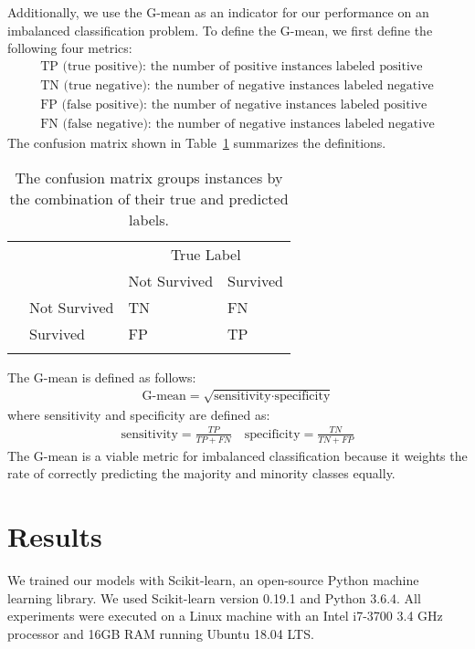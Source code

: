 \documentclass[review]{elsarticle}
\newcommand*\rot{\rotatebox{90}}
\begin{document}
Additionally, we use the G-mean as an indicator for our performance on an imbalanced classification problem. To define the G-mean, we first define the following four metrics:
\begin{align*}
\text{TP (true positive): the number of positive instances labeled positive}\\
\text{TN (true negative): the number of negative instances labeled negative}\\
\text{FP (false positive): the number of negative instances labeled positive}\\
\text{FN (false negative): the number of negative instances labeled negative}
\end{align*} 
The confusion matrix shown in Table~\ref{confusion-matrix} summarizes the definitions.
\begin{table}[H]
	\centering
	\begin{tabular}{llll}
		&                                   & \multicolumn{2}{c}{True Label}                     \\ 
		\cline{3-4}
		&                                   & Not Survived            & Survived                 \\ 
		\cline{3-4}
		\multirow{2}{*}{\rot{Predicted}} & \multicolumn{1}{|l|}{Not Survived} & \multicolumn{1}{l|}{TN} & \multicolumn{1}{l|}{FN}  \\ 
		\cline{3-4}
		\multicolumn{1}{l}{}                & \multicolumn{1}{|l|}{Survived}     & \multicolumn{1}{l|}{FP} & \multicolumn{1}{l|}{TP}  \\ 
		\cline{3-4}
		&                                   &                         &                         
	\end{tabular}
	\caption{The confusion matrix groups instances by the combination of their true and predicted labels.}
	\label{confusion-matrix}
\end{table}
\noindent The G-mean is defined as follows:
\begin{align*}
	\text{G-mean} = \sqrt{\text{sensitivity}\cdot\text{specificity}}
\end{align*}
where sensitivity and specificity are defined as:
\begin{align*}
\text{sensitivity} = \frac{TP}{TP + FN} \quad\text{specificity} = \frac{TN}{TN + FP}
\end{align*}
 The G-mean is a viable metric for imbalanced classification because it weights the rate of correctly predicting the majority and minority classes equally.
\section{Results}
We trained our models with Scikit-learn, an open-source Python machine learning library. We used Scikit-learn version 0.19.1 and Python 3.6.4. All experiments were executed on a Linux machine with an Intel i7-3700 3.4 GHz processor and 16GB RAM running Ubuntu 18.04 LTS.
\end{document}
